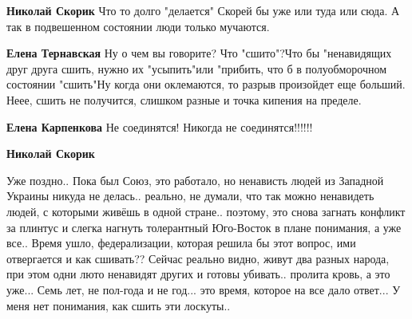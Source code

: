 \begin{itemize}
\begin{itemize}
 
\textbf{Николай Скорик} Что то долго "делается" Скорей бы уже или туда или сюда. А так в подвешенном состоянии люди только мучаются.

 
\textbf{Елена Тернавская} Ну о чем вы говорите? Что "сшито"?Что бы "ненавидящих
друг друга сшить, нужно их "усыпить"или "прибить, что б в полуобморочном
состоянии "сшить"Ну когда они оклемаются, то разрыв произойдет еще
больший. Неее, сшить не получится, слишком разные и точка кипения на пределе.

 
\textbf{Елена Карпенкова} Не соединятся! Никогда не соединятся!!!!!!

 
\textbf{Николай Скорик} 

Уже поздно.. Пока был Союз, это работало, но ненависть людей из Западной
Украины никуда не делась.. реально, не думали, что так можно ненавидеть людей,
с которыми живёшь в одной стране.. поэтому, это снова загнать конфликт за
плинтус и слегка нагнуть толерантный Юго-Восток в плане понимания, а уже все..
Время ушло, федерализации, которая решила бы этот вопрос, ими отвергается и как
сшивать?? Сейчас реально видно, живут два разных народа, при этом одни люто
ненавидят других и готовы убивать.. пролита кровь, а это уже... Семь лет, не
пол-года и не год... это время, которое на все дало ответ... У меня нет
понимания, как сшить эти лоскуты..

 

\end{itemize}
\end{itemize}
